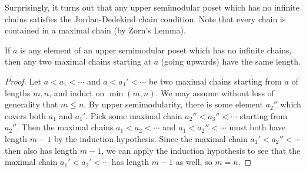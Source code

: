 \begin{appendices}
Surprisingly, it turns out that any upper semimodular poset which has no infinite chains satisfies the Jordan-Dedekind chain condition. Note that every chain is contained in a maximal chain (by Zorn's Lemma).%




\begin{prop} If $a$ is any element of an upper semimodular poset which has no infinite chains, then any two maximal chains starting at $a$ (going upwards) have the same length.
\end{prop}
\begin{proof} Let $a < a_1 < \cdots$ and $a < a_1' < \cdots$ be two maximal chains starting from $a$ of lengths $m, n$, and induct on $\min(m,n)$. We may assume without loss of generality that $m \le n$. By upper semimodularity, there is some element $a_2''$ which covers both $a_1$ and $a_1'$. Pick some maximal chain $a_2'' < a_3'' < \cdots$ starting from $a_2''$. Then the maximal chains $a_1 < a_2 < \cdots$ and $a_1 < a_2'' < \cdots$ must both have length $m-1$ by the induction hypothesis. Since the maximal chain $a_1' < a_2'' < \cdots$ then also has length $m-1$, we can apply the induction hypothesis to see that the maximal chain $a_1' < a_2' < \cdots$ has length $m-1$ as well, so $m = n$.
\end{proof}


\end{appendices}
